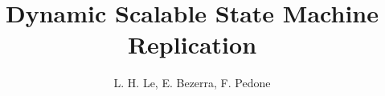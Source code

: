 \documentclass{llncs}
\begin{document}
\title{Dynamic Scalable State Machine Replication}

\author{L. H. Le,  E. Bezerra, F. Pedone}


\maketitle
%






\newpage

{}
\newpage
\end{document}
